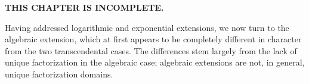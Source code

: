 

{\bf THIS CHAPTER IS INCOMPLETE.}

Having addressed logarithmic and exponential extensions, we now turn
to the algebraic extension, which at first appears to be completely
different in character from the two transcendental cases.  The
differences stem largely from the lack of unique factorization in the
algebraic case; algebraic extensions are not, in general, unique
factorization domains.

